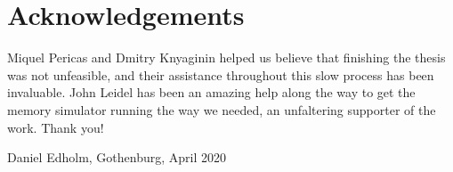 \thispagestyle{plain}			%
\section*{Acknowledgements}
Miquel Pericas and Dmitry Knyaginin helped us believe that finishing the thesis was not unfeasible, and their assistance throughout this slow process has been invaluable. John Leidel has been an amazing help along the way to get the memory simulator running the way we needed, an unfaltering supporter of the work. Thank you!

\vspace{1.5cm}
\hfill
Daniel Edholm, Gothenburg, April 2020%

\newpage				%
\thispagestyle{empty}
\mbox{}